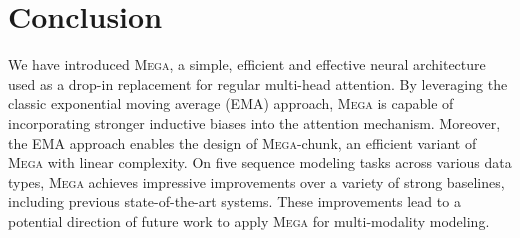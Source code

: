\section{Conclusion}
We have introduced \textsc{Mega}, a simple, efficient and effective neural architecture used as a drop-in replacement for regular multi-head attention. By leveraging the classic exponential moving average (EMA) approach, \textsc{Mega} is capable of incorporating stronger inductive biases into the attention mechanism. Moreover, the EMA approach enables the design of \textsc{Mega}-chunk, an efficient variant of \textsc{Mega} with linear complexity. On five sequence modeling tasks across various data types, \textsc{Mega} achieves impressive improvements over a variety of strong baselines, including previous state-of-the-art systems. These improvements lead to a potential direction of future work to apply \textsc{Mega} for multi-modality modeling.


